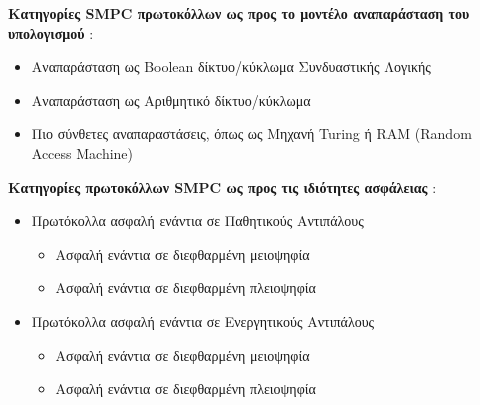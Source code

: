 \documentclass[10pt]{beamer}
\begin{document}
    \begin{frame}[c]{}
        \centering
        \begin{block}{}
            \textbf{Κατηγορίες SMPC πρωτοκόλλων ως προς το μοντέλο αναπαράσταση του υπολογισμού} :
            \begin{itemize}
                \item Αναπαράσταση ως Boolean δίκτυο/κύκλωμα Συνδυαστικής Λογικής
                \item Αναπαράσταση ως Αριθμητικό δίκτυο/κύκλωμα
                \item Πιο σύνθετες αναπαραστάσεις, όπως ως Μηχανή Turing ή RAM (Random Access Machine)
            \end{itemize}
        \end{block}
    \end{frame}

    \begin{frame}[c]{}
        \centering
        \begin{block}{}
            \textbf{Κατηγορίες πρωτοκόλλων SMPC ως προς τις ιδιότητες ασφάλειας} :
            \begin{itemize}
                \item Πρωτόκολλα ασφαλή ενάντια σε Παθητικούς Αντιπάλους
                \begin{itemize}
                    \item Ασφαλή ενάντια σε διεφθαρμένη μειοψηφία
                    \item Ασφαλή ενάντια σε διεφθαρμένη πλειοψηφία
                \end{itemize}
                \item Πρωτόκολλα ασφαλή ενάντια σε Ενεργητικούς Αντιπάλους
                \begin{itemize}
                    \item Ασφαλή ενάντια σε διεφθαρμένη μειοψηφία
                    \item Ασφαλή ενάντια σε διεφθαρμένη πλειοψηφία
                \end{itemize}
            \end{itemize}
        \end{block}
    \end{frame}
\end{document}
